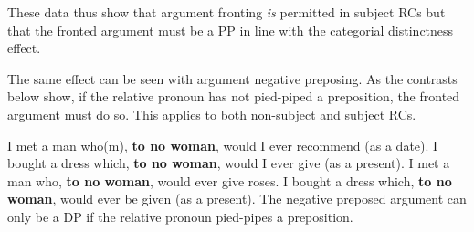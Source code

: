\documentclass[output=paper]{langsci/langscibook}
\begin{document}
\ea\label{ex:key:2.47}
    \z
\z

\ea\label{ex:key:2.48}
    \z
\z
These data thus show that argument fronting \emph{is} permitted in subject RCs
but that the fronted argument must be a PP in line with the categorial
distinctness effect.

The same effect can be seen with argument negative preposing. As the contrasts
below show, if the relative pronoun has not pied-piped a preposition, the
fronted argument must do so. This applies to both non-subject and subject \glspl{RC}.

\ea\label{ex:key:2.49}
    \ea     I met a man who(m), \textbf{to no woman}, would I ever recommend (as a date).
    \ex     I bought a dress which, \textbf{to no woman}, would I ever give (as a present).
    \ex     I met a man who, \textbf{to no woman}, would ever give roses.
    \ex     I bought a dress which, \textbf{to no woman}, would ever be given (as a present).
    \z
\z
\ea\label{ex:key:2.50}
    \z
\z
The negative preposed argument can only be a DP if the relative pronoun
pied-pipes a preposition.
\end{document}
